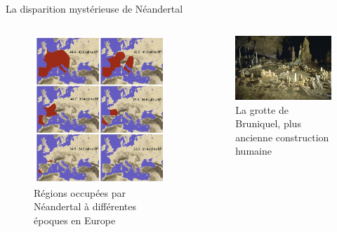 \documentclass[10pt]{beamer}
\begin{document}
\begin{frame}{La disparition mystérieuse de Néandertal}
	\begin{columns}
		\begin{column}{6cm}
			\begin{figure}[L]
				\includegraphics[width=0.8\linewidth]{Carte}\vfill
				\caption{Régions occupées par Néandertal à différentes époques en Europe}
			\end{figure}
		\end{column}
		\begin{column}{6cm}
			\begin{figure}[R]
				\includegraphics[width=0.8\linewidth]{GrotteBrunel} \vfill 
				\caption{La grotte de Bruniquel, plus ancienne construction humaine }
			\end{figure}
		\end{column}
	\end{columns}
\end{frame}	
\end{document}
